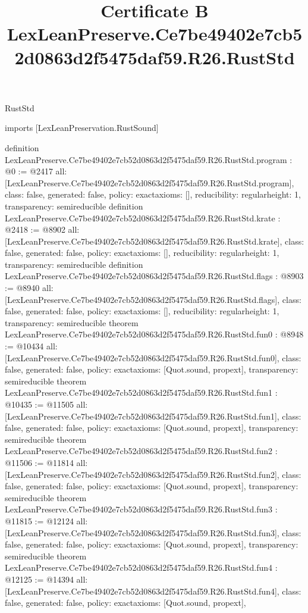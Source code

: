 \begin{lexlean}{RustStd}
\title{Certificate B LexLeanPreserve.Ce7be49402e7cb52d0863d2f5475daf59.R26.RustStd}
\begin{coremodule}
imports [LexLeanPreservation.RustSound]

definition LexLeanPreserve.Ce7be49402e7cb52d0863d2f5475daf59.R26.RustStd.program : @0 := @2417 {
  all: [LexLeanPreserve.Ce7be49402e7cb52d0863d2f5475daf59.R26.RustStd.program],
  class: false,
  generated: false,
  policy: exact{axioms: []},
  reducibility: regular{height: 1},
  transparency: semireducible
}
definition LexLeanPreserve.Ce7be49402e7cb52d0863d2f5475daf59.R26.RustStd.krate : @2418 := @8902 {
  all: [LexLeanPreserve.Ce7be49402e7cb52d0863d2f5475daf59.R26.RustStd.krate],
  class: false,
  generated: false,
  policy: exact{axioms: []},
  reducibility: regular{height: 1},
  transparency: semireducible
}
definition LexLeanPreserve.Ce7be49402e7cb52d0863d2f5475daf59.R26.RustStd.flags : @8903 := @8940 {
  all: [LexLeanPreserve.Ce7be49402e7cb52d0863d2f5475daf59.R26.RustStd.flags],
  class: false,
  generated: false,
  policy: exact{axioms: []},
  reducibility: regular{height: 1},
  transparency: semireducible
}
theorem LexLeanPreserve.Ce7be49402e7cb52d0863d2f5475daf59.R26.RustStd.fun0 : @8948 := @10434 {
  all: [LexLeanPreserve.Ce7be49402e7cb52d0863d2f5475daf59.R26.RustStd.fun0],
  class: false,
  generated: false,
  policy: exact{axioms: [Quot.sound, propext]},
  transparency: semireducible
}
theorem LexLeanPreserve.Ce7be49402e7cb52d0863d2f5475daf59.R26.RustStd.fun1 : @10435 := @11505 {
  all: [LexLeanPreserve.Ce7be49402e7cb52d0863d2f5475daf59.R26.RustStd.fun1],
  class: false,
  generated: false,
  policy: exact{axioms: [Quot.sound, propext]},
  transparency: semireducible
}
theorem LexLeanPreserve.Ce7be49402e7cb52d0863d2f5475daf59.R26.RustStd.fun2 : @11506 := @11814 {
  all: [LexLeanPreserve.Ce7be49402e7cb52d0863d2f5475daf59.R26.RustStd.fun2],
  class: false,
  generated: false,
  policy: exact{axioms: [Quot.sound, propext]},
  transparency: semireducible
}
theorem LexLeanPreserve.Ce7be49402e7cb52d0863d2f5475daf59.R26.RustStd.fun3 : @11815 := @12124 {
  all: [LexLeanPreserve.Ce7be49402e7cb52d0863d2f5475daf59.R26.RustStd.fun3],
  class: false,
  generated: false,
  policy: exact{axioms: [Quot.sound, propext]},
  transparency: semireducible
}
theorem LexLeanPreserve.Ce7be49402e7cb52d0863d2f5475daf59.R26.RustStd.fun4 : @12125 := @14394 {
  all: [LexLeanPreserve.Ce7be49402e7cb52d0863d2f5475daf59.R26.RustStd.fun4],
  class: false,
  generated: false,
  policy: exact{axioms: [Quot.sound, propext]},
}
\end{coremodule}
\end{lexlean}
